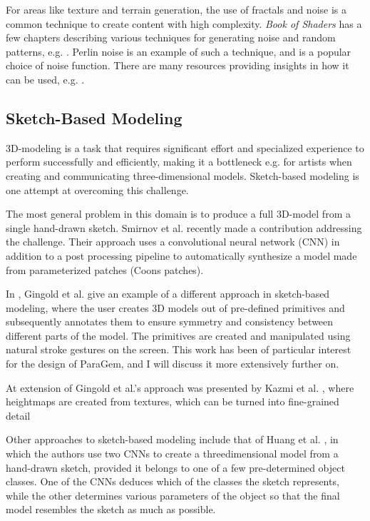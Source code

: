 \documentclass[english]{article}
\begin{document}
For areas like texture and terrain generation, the use of fractals and noise is a common technique to create content with high complexity. \textit{Book of Shaders} has a few chapters describing various techniques for generating noise and random patterns, e.g. \cite{book_of_shaders}. Perlin noise \cite{perlin_noise} is an example of such a technique, and is a popular choice of noise function. There are many resources providing insights in how it can be used, e.g. \cite{tutorial_perlin}.


\subsection{Sketch-Based Modeling} \label{subsection_review_sketch}

3D-modeling is a task that requires significant effort and specialized experience to perform successfully and efficiently, making it a bottleneck e.g. for artists when creating and communicating three-dimensional models. Sketch-based modeling is one attempt at overcoming this challenge. 

The most general problem in this domain is to produce a full 3D-model from a single hand-drawn sketch. Smirnov et al. \cite{recent_sketch_based} recently made a contribution addressing the challenge. Their approach uses a convolutional neural network (CNN) in addition to a post processing pipeline to automatically synthesize a model made from parameterized patches (Coons patches).

In \cite{gingold09}, Gingold et al. give an example of a different approach in sketch-based modeling, where the user creates 3D models out of pre-defined primitives and subsequently annotates them to ensure symmetry and consistency between different parts of the model. The primitives are created and manipulated using natural stroke gestures on the screen. This work has been of particular interest for the design of ParaGem, and I will discuss it more extensively further on.

At extension of Gingold et al.'s approach was presented by Kazmi et al. \cite{hybrid_character_modeling}, where heightmaps are created from textures, which can be turned into fine-grained detail 

Other approaches to sketch-based modeling include that of Huang et al. \cite{procedural_sketch_cnn}, in which the authors use two CNNs to create a threedimensional model from a hand-drawn sketch, provided it belongs to one of a few pre-determined object classes. One of the CNNs deduces which of the classes the sketch represents, while the other determines various parameters of the object so that the final model resembles the sketch as much as possible.
\end{document}
